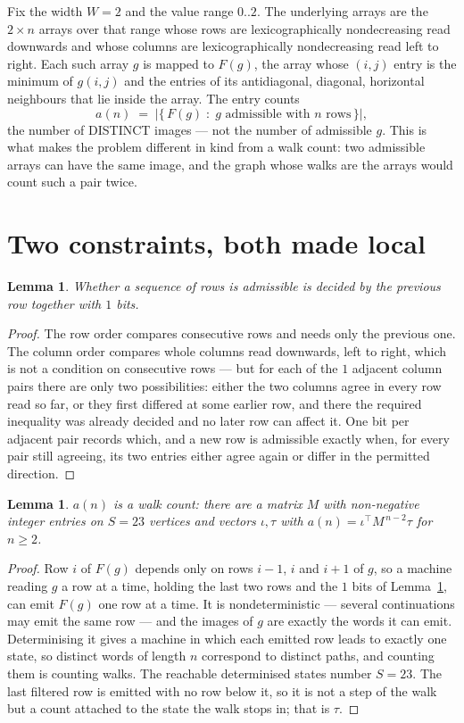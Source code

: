 \documentclass[11pt,a4paper]{article}
\theoremstyle{plain}
\newtheorem{lemma}[theorem]{Lemma}
\theoremstyle{definition}
\begin{document}
Fix the width $W=2$ and the value range $0..2$. The underlying arrays are the
$2\times n$ arrays over that range whose rows are lexicographically nondecreasing read downwards
and whose columns are lexicographically nondecreasing read left to right. Each such array $g$
is mapped to $F(g)$, the array whose $(i,j)$ entry is the minimum of $g(i,j)$ and the entries
of its antidiagonal, diagonal, horizontal neighbours that lie inside the array. The entry counts
\[
a(n)\;=\;\bigl|\{\,F(g)\;:\;g\text{ admissible with }n\text{ rows}\,\}\bigr|,
\]
the number of DISTINCT images --- not the number of admissible $g$. This is what makes the
problem different in kind from a walk count: two admissible arrays can have the same image, and
the graph whose walks are the arrays would count such a pair twice.

\section{Two constraints, both made local}

\begin{lemma}\label{lem:local}
Whether a sequence of rows is admissible is decided by the previous row together with
$1$ bits.
\end{lemma}

\begin{proof}
The row order compares consecutive rows and needs only the previous one. The column order
compares whole columns read downwards, left to right, which is not a condition on consecutive
rows --- but for each of the $1$ adjacent column pairs there are only two possibilities:
either the two columns agree in every row read so far, or they first differed at some earlier
row, and there the required inequality was already decided and no later row can affect it. One
bit per adjacent pair records which, and a new row is admissible exactly when, for every pair
still agreeing, its two entries either agree again or differ in the permitted direction.
\end{proof}

\begin{lemma}\label{lem:det}
$a(n)$ is a walk count: there are a matrix $M$ with non-negative integer entries on $S=23$
vertices and vectors $\iota,\tau$ with $a(n)=\iota^{\!\top}M^{\,n-2}\tau$ for $n\ge2$.
\end{lemma}

\begin{proof}
Row $i$ of $F(g)$ depends only on rows $i-1$, $i$ and $i+1$ of $g$, so a machine reading $g$ a
row at a time, holding the last two rows and the $1$ bits of Lemma~\ref{lem:local}, can
emit $F(g)$ one row at a time. It is nondeterministic --- several continuations may emit the
same row --- and the images of $g$ are exactly the words it can emit. Determinising it gives a
machine in which each emitted row leads to exactly one state, so distinct words of length $n$
correspond to distinct paths, and counting them is counting walks. The reachable determinised
states number $S=23$. The last filtered row is emitted with no row below it, so it is not a
step of the walk but a count attached to the state the walk stops in; that is $\tau$.
\end{proof}
\end{document}
